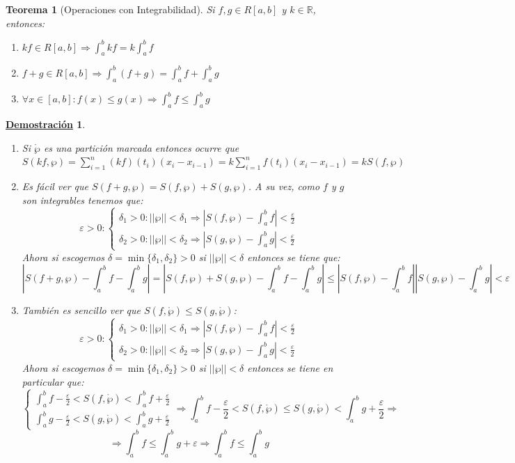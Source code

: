 \documentclass[10pt,a4paper,openright]{book}
\theoremstyle{break}
\newtheorem{theo}{Teorema}[chapter]
\newtheorem*{demo}{\underline{Demostración}}
\begin{document}
\begin{theo}[Operaciones con Integrabilidad]
Si $f,g\in R[a,b]$ y $k\in \mathbb R$, entonces:
\begin{enumerate}
\item $kf\in R[a,b]\Rightarrow \int_a^b kf = k\int_a^b f$
\item $f+g\in R[a,b]\Rightarrow \int_a^b (f+g)=\int_a^b f+\int_a^b g$
\item $\forall x\in [a,b]: f(x)\leq g(x)\Rightarrow \int_a^b f \leq \int_a^b g$
\end{enumerate}
\end{theo}
\begin{demo}
\begin{enumerate}
\item Si $\mathring{\wp}$ es una partición marcada entonces ocurre que $S(kf,\wp) = \sum_{i=1}^n(kf)(t_i)(x_i-x_{i-1})=k\sum_{i=1}^n f(t_i)(x_i-x_{i-1})=kS(f,\wp)$

\item Es fácil ver que $S(f+g, \wp)=S(f,\wp)+S(g,\wp)$. A su vez, como $f$ y $g$ son integrables tenemos que:
$$\varepsilon > 0 : \begin{cases}\delta_1>0: ||\wp ||<\delta_1\Rightarrow \left|S(f,\wp)-\int_a^b f\right|<\frac{\varepsilon}{2} \\ \delta_2>0: ||\wp ||<\delta_2\Rightarrow \left|S(g,\wp)-\int_a^b g\right|<\frac{\varepsilon}{2}  \end{cases}$$
Ahora si escogemos $\delta = \min\{\delta_1, \delta_2\}>0$ si $||\wp ||<\delta$ entonces se tiene que:
$$\left| S(f+g,\wp)-\int_a^b f-\int_a^b g \right|=\left|S(f,\wp)+S(g,\wp)-\int_a^b f-\int_a^b g\right| \leq \left|S(f,\wp)-\int_a^b f\right|\left| S(g,\wp)-\int_a^b g\right| <\varepsilon $$

\item También es sencillo ver que $S(f,\mathring{\wp}) \leq S(g,\mathring{\wp})$:
$$\varepsilon > 0 : \begin{cases}\delta_1>0: ||\wp ||<\delta_1\Rightarrow \left|S(f,\wp)-\int_a^b f\right|<\frac{\varepsilon}{2} \\ \delta_2>0: ||\wp ||<\delta_2\Rightarrow \left|S(g,\wp)-\int_a^b g\right|<\frac{\varepsilon}{2}  \end{cases}$$
Ahora si escogemos $\delta = \min\{\delta_1, \delta_2\}>0$ si $||\wp ||<\delta$ entonces se tiene en particular que:
$$\begin{cases} \int_{a}^{b} f -\frac{\varepsilon}{2} < S(f,\mathring{\wp}) < \int_{a}^{b} f + \frac{\varepsilon}{2} \\ \int_{a}^{b} g -\frac{\varepsilon}{2} < S(g,\mathring{\wp}) < \int_{a}^{b} g + \frac{\varepsilon}{2}\end{cases}\Rightarrow  \int_{a}^{b} f -\frac{\varepsilon}{2} < S(f,\mathring{\wp}) \leq S(g,\mathring{\wp}) < \int_{a}^{b} g + \frac{\varepsilon}{2}\Rightarrow $$
$$\Rightarrow \int_{a}^{b}f\leq \int_{a}^{b}g +\varepsilon\Rightarrow \int_{a}^{b}f\leq \int_{a}^{b}g$$
\end{enumerate}
\end{demo}
\end{document}
